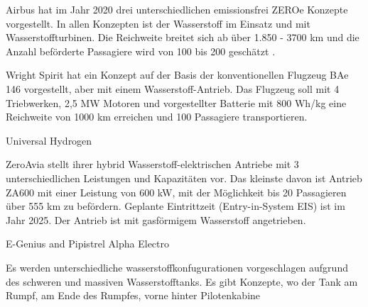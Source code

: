 Airbus hat im Jahr 2020 drei unterschiedlichen emissionsfrei ZEROe Konzepte vorgestellt. 
In allen Konzepten ist der Wasserstoff im Einsatz und mit Wasserstoffturbinen. Die Reichweite breitet sich ab über 1.850 - 
3700 km und die Anzahl beförderte Passagiere wird von 100 bis 200 geschätzt \cite{airbus_zea_concepts}.

Wright Spirit \cite{wright_electric_website} hat ein Konzept auf der Basis der konventionellen Flugzeug BAe 146 vorgestellt, aber mit einem Wasserstoff-Antrieb.
Das Flugzeug soll mit 4 Triebwerken, 2,5 MW Motoren und vorgestellter Batterie mit 800 Wh/kg eine Reichweite von 1000 
km erreichen und 100 Passagiere transportieren.


Universal Hydrogen

ZeroAvia stellt ihrer hybrid Wasserstoff-elektrischen Antriebe mit 3 unterschiedlichen Leistungen und Kapazitäten vor. Das kleinste davon
ist Antrieb ZA600 mit einer Leistung von 600 kW, mit der Möglichkeit bis 20 Passagieren über 555 km zu befördern. 
Geplante Eintrittzeit (Entry-in-System EIS) ist im Jahr 2025. Der Antrieb ist mit gasförmigem Wasserstoff angetrieben.

E-Genius and 
Pipistrel Alpha Electro


Es werden unterschiedliche wasserstoffkonfugurationen vorgeschlagen aufgrund des schweren und massiven Wasserstofftanks.
Es gibt Konzepte, wo der Tank am Rumpf, am Ende des Rumpfes, vorne hinter Pilotenkabine